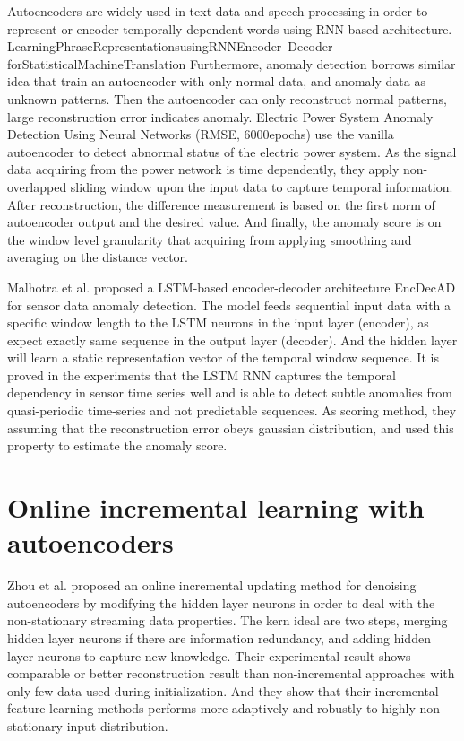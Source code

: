 Autoencoders are widely used in text data and speech processing in order to represent or encoder temporally dependent words using RNN based architecture. LearningPhraseRepresentationsusingRNNEncoder–Decoder forStatisticalMachineTranslation 
Furthermore, anomaly detection borrows similar idea that train an autoencoder with only normal data, and anomaly data as unknown patterns. Then the autoencoder can only reconstruct normal patterns, large reconstruction error indicates anomaly. 
Electric Power System Anomaly Detection Using Neural Networks (RMSE, 6000epochs) use the vanilla autoencoder to detect abnormal status of the electric power system. As the signal data acquiring from the power network is time dependently, they apply non-overlapped sliding window upon the input data to capture temporal information. After reconstruction, the difference measurement is based on the first norm of autoencoder output and the desired value. And finally, the anomaly score is on the window level granularity that acquiring from applying smoothing and averaging on the distance vector.

Malhotra et al. proposed a LSTM-based encoder-decoder architecture EncDecAD for sensor data anomaly detection. The model feeds sequential input data with a specific window length to the LSTM neurons in the input layer (encoder), as expect exactly same sequence in the output layer (decoder). And the hidden layer will learn a static representation vector of the temporal window sequence. It is proved in the experiments that the LSTM RNN captures the temporal dependency in sensor time series well and is able to detect subtle anomalies from quasi-periodic time-series and not predictable sequences. As scoring method, they assuming that the reconstruction error obeys gaussian distribution, and used this property to estimate the anomaly score.



\section{Online incremental learning with autoencoders}
\label{sec:Online incremental learning with autoencoders}

Zhou et al. proposed an online incremental updating method for denoising autoencoders by modifying the hidden layer neurons in order to deal with the non-stationary streaming data properties. The kern ideal are two steps, merging hidden layer neurons if there are information redundancy, and adding hidden layer neurons to capture new knowledge. Their experimental result shows comparable or better reconstruction result than non-incremental approaches with only few data used during initialization. And they show that their incremental feature learning methods performs more adaptively and robustly to highly non-stationary input distribution.

